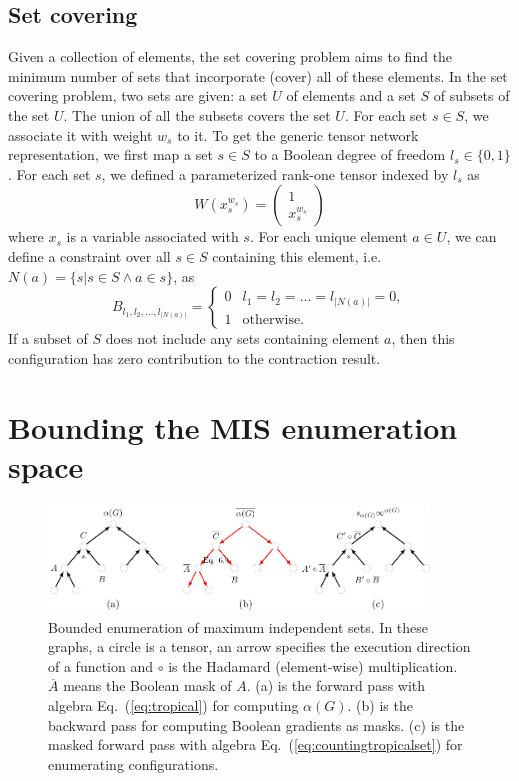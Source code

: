 \documentclass[onefignum, onetabnum]{siamart190516}
\newcommand{\<}{\langle}
\renewcommand{\>}{\rangle}
\newcommand{\Eq}[1]{Eq.~(\ref{#1})}
\begin{document}
\subsection{Set covering}
Given a collection of elements, the set covering problem aims to find the minimum number of sets that incorporate (cover) all of these elements.
In the set covering problem, two sets are given: a set $U$ of elements and a set $S$ of subsets of the set $U$. The union of all the subsets covers the set $U$. For each set $s \in S$, we associate it with weight $w_s$ to it.
To get the generic tensor network representation, we first map a set $s\in S$ to a Boolean degree of freedom $l_s\in\{0, 1\}$.
For each set $s$, we defined a parameterized rank-one tensor indexed by $l_s$ as
\begin{equation}
W(x_s^{w_s}) = \left(\begin{matrix}
    1 \\
    x_s^{w_s}
    \end{matrix}\right)
\end{equation}
where $x_s$ is a variable associated with $s$.
For each unique element $a \in U$, we can define a constraint over all $s \in S$ containing this element, i.e. $N(a) = \{s | s \in S \land a\in s\}$, as
\begin{equation}
B_{l_1,l_2,\ldots,l_{|N(a)|}} = \begin{cases}
    0 & l_1=l_2=\ldots=l_{|N(a)|}=0,\\
    1 & \text{otherwise}.
\end{cases}
\end{equation}
If a subset of $S$ does not include any sets containing element $a$, then this configuration has zero contribution to the contraction result.

\section{Bounding the MIS enumeration space}\label{sec:bounding}
\begin{figure}
    \centering
    \includegraphics[width=0.9\textwidth, trim={0cm 0cm 0cm 0cm}, clip]{figures/masktree.pdf}
    \caption{Bounded enumeration of maximum independent sets. In these graphs, a circle is a tensor, an arrow specifies the execution direction of a function and $\circ$ is the Hadamard (element-wise) multiplication. $\overline A$ means the Boolean mask of $A$. (a) is the forward pass with algebra \Eq{eq:tropical} for computing $\alpha(G)$.
     (b) is the backward pass for computing Boolean gradients as masks.
     (c) is the masked forward pass with algebra \Eq{eq:countingtropicalset} for enumerating configurations.}
     \label{fig:bounding}
\end{figure}
\end{document}
